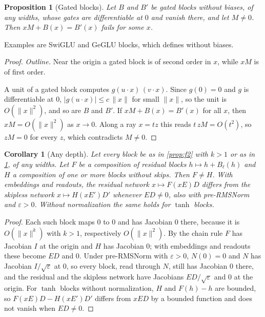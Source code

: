 \documentclass[10pt]{article}
\newtheorem{proposition}[theorem]{Proposition}
\newtheorem{corollary}[theorem]{Corollary}
\theoremstyle{definition}
\theoremstyle{remark}
\newcommand{\norm}[1]{\lVert #1\rVert}
\begin{document}
\begin{proposition}[Gated blocks]\label{prop:gated}
Let $B$ and $B'$ be gated blocks without biases, of any widths, whose gates are differentiable at $0$ and vanish there, and let $M \neq 0$. Then $xM + B(x) = B'(x)$ fails for some $x$.
\end{proposition}
Examples are SwiGLU and GeGLU blocks, which \citet{shazeer2020glu} defines without biases.
\begin{proof}
\emph{Outline.} Near the origin a gated block is of second order in $x$, while $xM$ is of first order.

A unit of a gated block computes $g(u\cdot x)\,(v\cdot x)$. Since $g(0) = 0$ and $g$ is differentiable at $0$, $\lvert g(u\cdot x)\rvert \le c\,\norm{x}$ for small $\norm{x}$, so the unit is $O(\norm{x}^2)$, and so are $B$ and $B'$. If $xM + B(x) = B'(x)$ for all $x$, then $xM = O(\norm{x}^2)$ as $x \to 0$. Along a ray $x = tz$ this reads $t\,zM = O(t^2)$, so $zM = 0$ for every $z$, which contradicts $M \neq 0$.
\end{proof}

\begin{corollary}[Any depth]\label{cor:depth}
Let every block be as in \cref{prop:f2} with $k > 1$ or as in \cref{prop:gated}, of any widths. Let $F$ be a composition of residual blocks $h \mapsto h + B_\ell(h)$ and $H$ a composition of one or more blocks without skips. Then $F \neq H$. With embeddings and readouts, the residual network $x \mapsto F(xE)D$ differs from the skipless network $x \mapsto H(xE')D'$ whenever $ED \neq 0$, also with pre-RMSNorm and $\varepsilon > 0$. Without normalization the same holds for $\tanh$ blocks.
\end{corollary}
\begin{proof}
Each such block maps $0$ to $0$ and has Jacobian $0$ there, because it is $O(\norm{x}^k)$ with $k > 1$, respectively $O(\norm{x}^2)$. By the chain rule $F$ has Jacobian $I$ at the origin and $H$ has Jacobian $0$; with embeddings and readouts these become $ED$ and $0$. Under pre-RMSNorm with $\varepsilon > 0$, $N(0) = 0$ and $N$ has Jacobian $I/\sqrt{\varepsilon}$ at $0$, so every block, read through $N$, still has Jacobian $0$ there, and the residual and the skipless network have Jacobians $ED/\sqrt{\varepsilon}$ and $0$ at the origin. For $\tanh$ blocks without normalization, $H$ and $F(h) - h$ are bounded, so $F(xE)D - H(xE')D'$ differs from $xED$ by a bounded function and does not vanish when $ED \neq 0$.
\end{proof}
\end{document}
